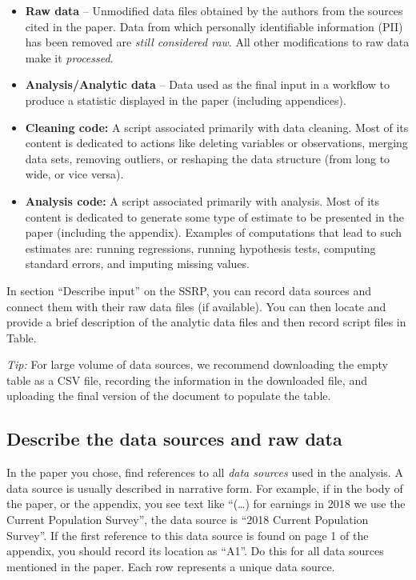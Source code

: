 \documentclass[
]{book}
\providecommand{\tightlist}{%
  \setlength{\itemsep}{0pt}\setlength{\parskip}{0pt}}
\begin{document}
\begin{itemize}
\tightlist
\item
  \textbf{Raw data} -- Unmodified data files obtained by the authors from the sources cited in the paper. Data from which personally identifiable information (PII) has been removed are \emph{still considered raw}. All other modifications to raw data make it \emph{processed}.\\
\item
  \textbf{Analysis/Analytic data} -- Data used as the final input in a workflow to produce a statistic displayed in the paper (including appendices).\\
\item
  \textbf{Cleaning code:} A script associated primarily with data cleaning. Most of its content is dedicated to actions like deleting variables or observations, merging data sets, removing outliers, or reshaping the data structure (from long to wide, or vice versa).\\
\item
  \textbf{Analysis code:} A script associated primarily with analysis. Most of its content is dedicated to generate some type of estimate to be presented in the paper (including the appendix). Examples of computations that lead to such estimates are: running regressions, running hypothesis tests, computing standard errors, and imputing missing values.
\end{itemize}

In section ``Describe input'' on the SSRP, you can record data sources and connect them with their raw data files (if available). You can then locate and provide a brief description of the analytic data files and then record script files in Table.

\emph{Tip:} For large volume of data sources, we recommend downloading the empty table as a CSV file, recording the information in the downloaded file, and uploading the final version of the document to populate the table.

\hypertarget{desc-sourc}{%
\subsection{Describe the data sources and raw data}\label{desc-sourc}}

In the paper you chose, find references to all \emph{data sources} used in the analysis. A data source is usually described in narrative form. For example, if in the body of the paper, or the appendix, you see text like ``(\ldots) for earnings in 2018 we use the Current Population Survey'', the data source is ``2018 Current Population Survey''. If the first reference to this data source is found on page 1 of the appendix, you should record its location as ``A1''. Do this for all data sources mentioned in the paper. Each row represents a unique data source.
\end{document}

